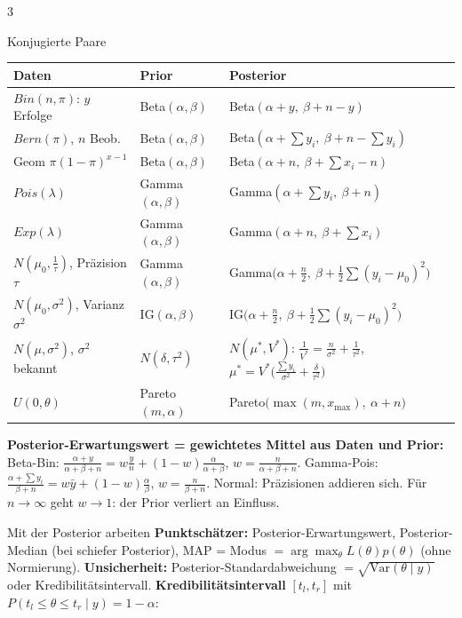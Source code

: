 \documentclass[8pt,a4paper,landscape]{extarticle}
\renewcommand{\arraystretch}{1.12}
\newcommand{\V}{\mathrm{Var}}
\begin{document}
\begin{multicols*}{3}
\begin{rechnen}{Konjugierte Paare}
{\renewcommand{\arraystretch}{1.35}\begin{tabularx}{\linewidth}{@{}>{\raggedright\arraybackslash}p{2.25cm}>{\raggedright\arraybackslash}p{1.95cm}>{\raggedright\arraybackslash}X@{}}
\toprule
Daten & Prior & Posterior \\
\midrule
$Bin(n,\pi)$: $y$ Erfolge & Beta$(\alpha,\beta)$ & Beta$(\alpha+y,\ \beta+n-y)$ \\
$Bern(\pi)$, $n$ Beob. & Beta$(\alpha,\beta)$ & Beta$(\alpha+\sum y_i,\ \beta+n-\sum y_i)$ \\
Geom $\pi(1-\pi)^{x-1}$ & Beta$(\alpha,\beta)$ & Beta$(\alpha+n,\ \beta+\sum x_i-n)$ \\
$Pois(\lambda)$ & Gamma$(\alpha,\beta)$ & Gamma$(\alpha+\sum y_i,\ \beta+n)$ \\
$Exp(\lambda)$ & Gamma$(\alpha,\beta)$ & Gamma$(\alpha+n,\ \beta+\sum x_i)$ \\
$N(\mu_0,\frac1\tau)$, Präzision $\tau$ & Gamma$(\alpha,\beta)$ & Gamma$\big(\alpha+\frac n2,\ \beta+\frac12\sum(y_i-\mu_0)^2\big)$ \\
$N(\mu_0,\sigma^2)$, Varianz $\sigma^2$ & IG$(\alpha,\beta)$ & IG$\big(\alpha+\frac n2,\ \beta+\frac12\sum(y_i-\mu_0)^2\big)$ \\
$N(\mu,\sigma^2)$, $\sigma^2$ bekannt & $N(\delta,\tau^2)$ & $N(\mu^*,V^*)$: $\frac{1}{V^*}=\frac{n}{\sigma^2}+\frac{1}{\tau^2}$, \ $\mu^*=V^*\big(\frac{\sum y_i}{\sigma^2}+\frac{\delta}{\tau^2}\big)$ \\
$U(0,\theta)$ & Pareto$(m,\alpha)$ & Pareto$\big(\max(m,x_{\max}),\ \alpha+n\big)$ \\
\bottomrule
\end{tabularx}}
\textbf{Posterior-Erwartungswert = gewichtetes Mittel aus Daten und Prior:} Beta-Bin: $\frac{\alpha+y}{\alpha+\beta+n}=w\frac yn+(1-w)\frac{\alpha}{\alpha+\beta}$, $w=\frac{n}{\alpha+\beta+n}$. Gamma-Pois: $\frac{\alpha+\sum y_i}{\beta+n}=w\bar y+(1-w)\frac\alpha\beta$, $w=\frac{n}{\beta+n}$. Normal: Präzisionen addieren sich. Für $n\to\infty$ geht $w\to 1$: der Prior verliert an Einfluss.
\end{rechnen}
\begin{wissen}{Mit der Posterior arbeiten}
\textbf{Punktschätzer:} Posterior-Erwartungswert, Posterior-Median (bei schiefer Posterior), MAP = Modus $=\arg\max_\theta L(\theta)p(\theta)$ (ohne Normierung). \textbf{Unsicherheit:} Posterior-Standardabweichung $=\sqrt{\V(\theta\mid y)}$ oder Kredibilitätsintervall.
\textbf{Kredibilitätsintervall} $[t_l,t_r]$ mit $P(t_l\le\theta\le t_r\mid y)=1-\alpha$:

\end{wissen}
\end{multicols*}
\end{document}
